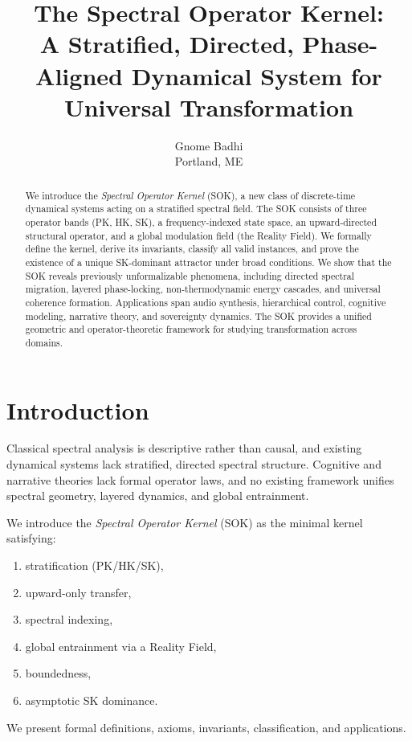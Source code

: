 \documentclass[11pt]{article}
\title{The Spectral Operator Kernel:\\
A Stratified, Directed, Phase-Aligned Dynamical System for Universal Transformation}
\author{Gnome Badhi \\ \small Portland, ME}
\date{}
\begin{document}
\maketitle

\begin{abstract}
We introduce the \emph{Spectral Operator Kernel} (SOK), a new class of 
discrete-time dynamical systems acting on a stratified spectral field.
The SOK consists of three operator bands (PK, HK, SK), a frequency-indexed 
state space, an upward-directed structural operator, and a global modulation 
field (the Reality Field). We formally define the kernel, derive its invariants, 
classify all valid instances, and prove the existence of a unique SK-dominant 
attractor under broad conditions. We show that the SOK reveals previously 
unformalizable phenomena, including directed spectral migration, layered 
phase-locking, non-thermodynamic energy cascades, and universal coherence 
formation. Applications span audio synthesis, hierarchical control, cognitive 
modeling, narrative theory, and sovereignty dynamics. The SOK provides a unified 
geometric and operator-theoretic framework for studying transformation across domains.
\end{abstract}

\section{Introduction}

Classical spectral analysis is descriptive rather than causal, and existing 
dynamical systems lack stratified, directed spectral structure. Cognitive and 
narrative theories lack formal operator laws, and no existing framework unifies 
spectral geometry, layered dynamics, and global entrainment.

We introduce the \emph{Spectral Operator Kernel} (SOK) as the minimal kernel 
satisfying:
\begin{enumerate}[label=(\roman*)]
    \item stratification (PK/HK/SK),
    \item upward-only transfer,
    \item spectral indexing,
    \item global entrainment via a Reality Field,
    \item boundedness,
    \item asymptotic SK dominance.
\end{enumerate}

We present formal definitions, axioms, invariants, classification, and 
applications.
\end{document}
